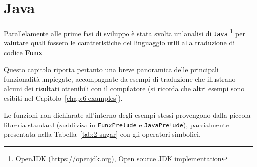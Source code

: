 \chapter{Java}
\label{chap:4-java}

Parallelamente alle prime fasi di sviluppo è stata svolta un'analisi di \texttt{Java}%
\footnote{OpenJDK (\url{https://openjdk.org}), Open source JDK implementation}
per valutare quali fossero le caratteristiche del linguaggio utili alla traduzione di codice \textbf{Funx}.

\noindent Questo capitolo riporta pertanto una breve panoramica delle principali funzionalità impiegate,
accompagnate da esempi di traduzione che illustrano alcuni dei risultati ottenibili con il compilatore
(si ricorda che altri esempi sono esibiti nel Capitolo~\ref{chap:6-examples}).

Le funzioni non dichiarate all'interno degli esempi stessi provengono dalla piccola libreria standard
(suddivisa in \texttt{FunxPrelude} e \texttt{JavaPrelude}),
parzialmente presentata nella Tabella~\ref{tab:2-sugar} con gli operatori simbolici.



\newpage



\newpage

